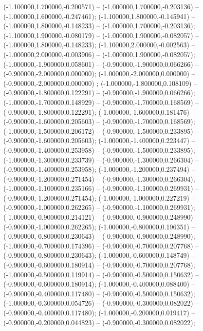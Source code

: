  (-1.100000,1.700000,-0.200571) -- (-1.000000,1.700000,-0.203136) -- (-1.000000,1.600000,-0.247461);
 (-1.100000,1.800000,-0.145941) -- (-1.000000,1.800000,-0.148233) -- (-1.000000,1.700000,-0.203136);
 (-1.100000,1.900000,-0.080179) -- (-1.000000,1.900000,-0.082057) -- (-1.000000,1.800000,-0.148233);
 (-1.100000,2.000000,-0.002563) -- (-1.000000,2.000000,-0.003906) -- (-1.000000,1.900000,-0.082057);
 (-1.000000,-1.900000,0.058601) -- (-0.900000,-1.900000,0.066266) -- (-0.900000,-2.000000,0.000000);
 (-1.000000,-2.000000,0.000000) -- (-0.900000,-2.000000,0.000000) ;
 (-1.000000,-1.800000,0.108109) -- (-0.900000,-1.800000,0.122291) -- (-0.900000,-1.900000,0.066266);
 (-1.000000,-1.700000,0.148929) -- (-0.900000,-1.700000,0.168569) -- (-0.900000,-1.800000,0.122291);
 (-1.000000,-1.600000,0.181476) -- (-0.900000,-1.600000,0.205603) -- (-0.900000,-1.700000,0.168569);
 (-1.000000,-1.500000,0.206172) -- (-0.900000,-1.500000,0.233895) -- (-0.900000,-1.600000,0.205603);
 (-1.000000,-1.400000,0.223447) -- (-0.900000,-1.400000,0.253958) -- (-0.900000,-1.500000,0.233895);
 (-1.000000,-1.300000,0.233739) -- (-0.900000,-1.300000,0.266304) -- (-0.900000,-1.400000,0.253958);
 (-1.000000,-1.200000,0.237494) -- (-0.900000,-1.200000,0.271454) -- (-0.900000,-1.300000,0.266304);
 (-1.000000,-1.100000,0.235166) -- (-0.900000,-1.100000,0.269931) -- (-0.900000,-1.200000,0.271454);
 (-1.000000,-1.000000,0.227219) -- (-0.900000,-1.000000,0.262265) -- (-0.900000,-1.100000,0.269931);
 (-1.000000,-0.900000,0.214121) -- (-0.900000,-0.900000,0.248990) -- (-0.900000,-1.000000,0.262265);
 (-1.000000,-0.800000,0.196351) -- (-0.900000,-0.800000,0.230643) -- (-0.900000,-0.900000,0.248990);
 (-1.000000,-0.700000,0.174396) -- (-0.900000,-0.700000,0.207768) -- (-0.900000,-0.800000,0.230643);
 (-1.000000,-0.600000,0.148749) -- (-0.900000,-0.600000,0.180914) -- (-0.900000,-0.700000,0.207768);
 (-1.000000,-0.500000,0.119914) -- (-0.900000,-0.500000,0.150632) -- (-0.900000,-0.600000,0.180914);
 (-1.000000,-0.400000,0.088400) -- (-0.900000,-0.400000,0.117480) -- (-0.900000,-0.500000,0.150632);
 (-1.000000,-0.300000,0.054726) -- (-0.900000,-0.300000,0.082022) -- (-0.900000,-0.400000,0.117480);
 (-1.000000,-0.200000,0.019417) -- (-0.900000,-0.200000,0.044823) -- (-0.900000,-0.300000,0.082022);
